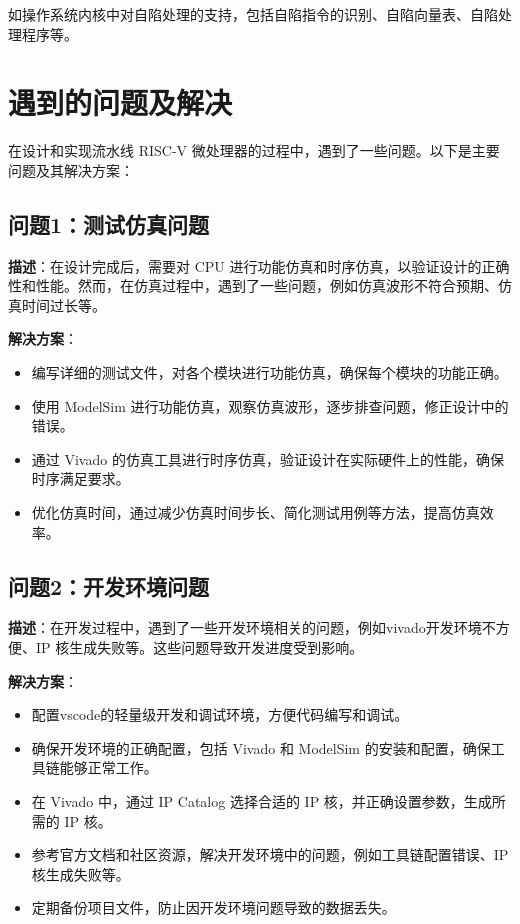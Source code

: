 \documentclass[12pt,hyperref,a4paper,UTF8]{ctexart}
\begin{document}
如操作系统内核中对自陷处理的支持，包括自陷指令的识别、自陷向量表、自陷处理程序等。


\newpage

\section{遇到的问题及解决}
在设计和实现流水线 RISC-V 微处理器的过程中，遇到了一些问题。以下是主要问题及其解决方案：

\subsection{问题1：测试仿真问题}

\textbf{描述}：在设计完成后，需要对 CPU 进行功能仿真和时序仿真，以验证设计的正确性和性能。然而，在仿真过程中，遇到了一些问题，例如仿真波形不符合预期、仿真时间过长等。

\textbf{解决方案}：
\begin{itemize}
    \item 编写详细的测试文件，对各个模块进行功能仿真，确保每个模块的功能正确。
    \item 使用 ModelSim 进行功能仿真，观察仿真波形，逐步排查问题，修正设计中的错误。
    \item 通过 Vivado 的仿真工具进行时序仿真，验证设计在实际硬件上的性能，确保时序满足要求。
    \item 优化仿真时间，通过减少仿真时间步长、简化测试用例等方法，提高仿真效率。
\end{itemize}

\subsection{问题2：开发环境问题}

\textbf{描述}：在开发过程中，遇到了一些开发环境相关的问题，例如vivado开发环境不方便、IP 核生成失败等。这些问题导致开发进度受到影响。

\textbf{解决方案}：
\begin{itemize}
    \item 配置vscode的轻量级开发和调试环境，方便代码编写和调试。
    \item 确保开发环境的正确配置，包括 Vivado 和 ModelSim 的安装和配置，确保工具链能够正常工作。
    \item 在 Vivado 中，通过 IP Catalog 选择合适的 IP 核，并正确设置参数，生成所需的 IP 核。
    \item 参考官方文档和社区资源，解决开发环境中的问题，例如工具链配置错误、IP 核生成失败等。
    \item 定期备份项目文件，防止因开发环境问题导致的数据丢失。
\end{itemize}
\end{document}
